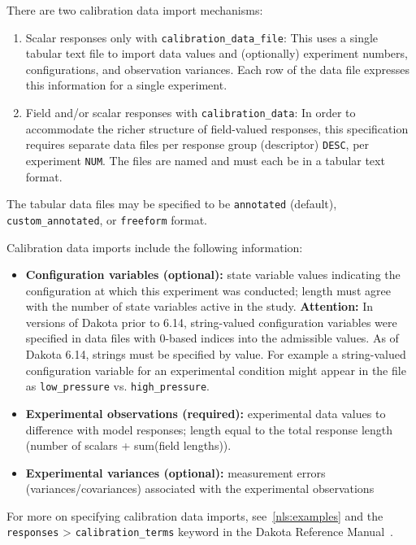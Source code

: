 There are two calibration data import mechanisms:
\begin{enumerate}
\item Scalar responses only with \texttt{calibration\_data\_file}: This
  uses a single tabular text file to import data values and
  (optionally) experiment numbers, configurations, and observation
  variances.  Each row of the data file expresses this information for
  a single experiment.

\item Field and/or scalar responses with \texttt{calibration\_data}:
  In order to accommodate the richer structure of field-valued
  responses, this specification requires separate data files per
  response group (descriptor) {\tt DESC}, per experiment {\tt NUM}.
  The files are named  and must each be in a
  tabular text format.
\end{enumerate}
The tabular data files may be specified to be {\tt annotated}
(default), {\tt custom\_annotated}, or {\tt freeform} format.

Calibration data imports include the following information:
\begin{itemize}
\item {\bf Configuration variables (optional):} state variable values
  indicating the configuration at which this experiment was conducted;
  length must agree with the number of state variables active in the
  study. {\bf Attention:} In versions of Dakota prior to 6.14,
  string-valued configuration variables were specified in data files
  with 0-based indices into the admissible values. As of Dakota 6.14,
  strings must be specified by value. For example a string-valued
  configuration variable for an experimental condition might appear in
  the file as {\tt low\_pressure} vs. {\tt high\_pressure}.
\item {\bf Experimental observations (required):} experimental data
  values to difference with model responses; length equal to the total
  response length (number of scalars + sum(field lengths)).
\item {\bf Experimental variances (optional):} measurement errors
  (variances/covariances) associated with the experimental
  observations
\end{itemize}

For more on specifying calibration data imports,
see~\ref{nls:examples} and the \texttt{responses} \textgreater 
\texttt{calibration\_terms} keyword in the Dakota Reference
Manual~\cite{RefMan}.

